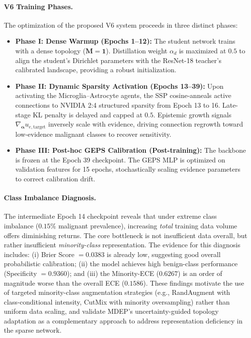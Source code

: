 \documentclass[letterpaper]{article} %
\begin{document}
\paragraph{V6 Training Phases.}
The optimization of the proposed V6 system proceeds in three distinct phases:
\begin{itemize}
    \item \textbf{Phase I: Dense Warmup (Epochs 1--12):} The student network trains with a dense topology ($\bm{M} = \bm{1}$). Distillation weight $\alpha_d$ is maximized at $0.5$ to align the student's Dirichlet parameters with the ResNet-18 teacher's calibrated landscape, providing a robust initialization.
    \item \textbf{Phase II: Dynamic Sparsity Activation (Epochs 13--39):} Upon activating the Microglia--Astrocyte agents, the SSP cosine-anneals active connections to NVIDIA 2:4 structured sparsity from Epoch 13 to 16. Late-stage KL penalty is delayed and capped at $0.5$. Epistemic growth signals $\nabla_{\bm{\alpha}} u_{e,\text{target}}$ inversely scale with evidence, driving connection regrowth toward low-evidence malignant classes to recover sensitivity.
    \item \textbf{Phase III: Post-hoc GEPS Calibration (Post-training):} The backbone is frozen at the Epoch 39 checkpoint. The GEPS MLP is optimized on validation features for 15 epochs, stochastically scaling evidence parameters to correct calibration drift.
\end{itemize}

\paragraph{Class Imbalance Diagnosis.} The intermediate Epoch 14 checkpoint reveals that under extreme class imbalance ($0.15\%$ malignant prevalence), increasing \emph{total} training data volume offers diminishing returns. The core bottleneck is not insufficient data overall, but rather insufficient \emph{minority-class} representation. The evidence for this diagnosis includes: (i) Brier Score $= 0.0383$ is already low, suggesting good overall probabilistic calibration; (ii) the model achieves high benign-class performance (Specificity $= 0.9360$); and (iii) the Minority-ECE ($0.6267$) is an order of magnitude worse than the overall ECE ($0.1586$). These findings motivate the use of targeted minority-class augmentation strategies (e.g., RandAugment with class-conditional intensity, CutMix with minority oversampling) rather than uniform data scaling, and validate MDEP's uncertainty-guided topology adaptation as a complementary approach to address representation deficiency in the sparse network.
\end{document}
